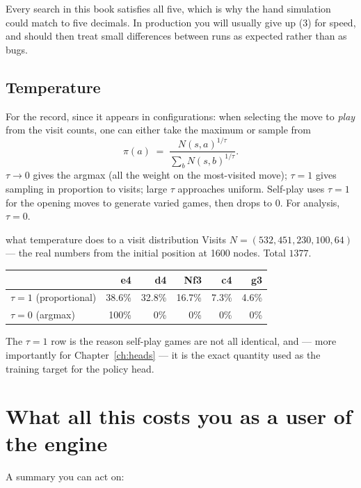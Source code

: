 Every search in this book satisfies all five, which is why the hand simulation could match to
five decimals. In production you will usually give up (3) for speed, and should then treat
small differences between runs as expected rather than as bugs.

\subsection{Temperature}

For the record, since it appears in configurations: when selecting the move to \emph{play}
from the visit counts, one can either take the maximum or sample from
\begin{equation}
  \label{eq:temperature}
  \pi(a) \;=\; \frac{N(s,a)^{1/\tau}}{\sum_b N(s,b)^{1/\tau}} .
\end{equation}
$\tau \to 0$ gives the argmax (all the weight on the most-visited move); $\tau = 1$ gives
sampling in proportion to visits; large $\tau$ approaches uniform. Self-play uses $\tau = 1$
for the opening moves to generate varied games, then drops to $0$. For analysis, $\tau = 0$.

\begin{worked}{what temperature does to a visit distribution}
Visits $N = (532, 451, 230, 100, 64)$ --- the real numbers from the initial position at 1600
nodes. Total $1377$.
\begin{center}
\begin{tabular}{@{}lrrrrr@{}}
\toprule
 & e4 & d4 & Nf3 & c4 & g3 \\
\midrule
$\tau = 1$ (proportional) & 38.6\% & 32.8\% & 16.7\% & 7.3\% & 4.6\% \\
$\tau = 0$ (argmax)       & 100\%  & 0\%    & 0\%    & 0\%   & 0\%  \\
\bottomrule
\end{tabular}
\end{center}
The $\tau=1$ row is the reason self-play games are not all identical, and --- more
importantly for Chapter~\ref{ch:heads} --- it is the exact quantity used as the training
target for the policy head.
\end{worked}

\section{What all this costs you as a user of the engine}

A summary you can act on:


